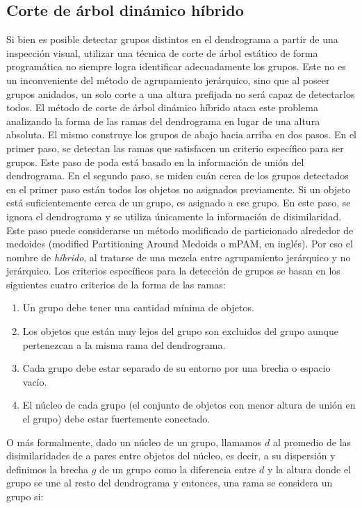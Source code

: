 \subsection{Corte de árbol dinámico híbrido}
Si bien es posible detectar grupos distintos en el dendrograma a partir de una inspección visual, utilizar una técnica de corte de árbol estático de forma programática no siempre logra identificar adecuadamente los grupos. Este no es un inconveniente del método de agrupamiento jerárquico, sino que al poseer grupos anidados, un solo corte a una altura prefijada no será capaz de detectarlos todos. El método de corte de árbol dinámico híbrido ataca este problema analizando la forma de las ramas del dendrograma en lugar de una altura absoluta. El mismo construye los grupos de abajo hacia arriba en dos pasos. En el primer paso, se detectan las ramas que satisfacen un criterio específico para ser grupos. Este paso de poda está basado en la información de unión del dendrograma. En el segundo paso, se miden cuán cerca de los grupos detectados en el primer paso están todos los objetos no asignados previamente. Si un objeto está suficientemente cerca de un grupo, es asignado a ese grupo. En este paso, se ignora el dendrograma y se utiliza únicamente la información de disimilaridad. Este paso puede considerarse un método modificado de particionado alrededor de medoides (modified Partitioning Around Medoids o mPAM, en inglés). Por eso el nombre de \textit{híbrido}, al tratarse de una mezcla entre agrupamiento jerárquico y no jerárquico.
Los criterios específicos para la detección de grupos se basan en los siguientes cuatro criterios de la forma de las ramas:
\begin{enumerate}
\item Un grupo debe tener una cantidad mínima de objetos.
\item Los objetos que están muy lejos del grupo son excluidos del grupo aunque pertenezcan a la misma rama del dendrograma.
\item Cada grupo debe estar separado de su entorno por una brecha o espacio vacío.
\item El núcleo de cada grupo (el conjunto de objetos con menor altura de unión en el grupo) debe estar fuertemente conectado.
\end{enumerate}
O más formalmente, dado un núcleo de un grupo, llamamos $d$ al promedio de las disimilaridades de a pares entre objetos del núcleo, es decir, a su dispersión y definimos la brecha $g$ de un grupo como la diferencia entre $d$ y la altura donde el grupo se une al resto del dendrograma y entonces, una rama se considera un grupo si:
